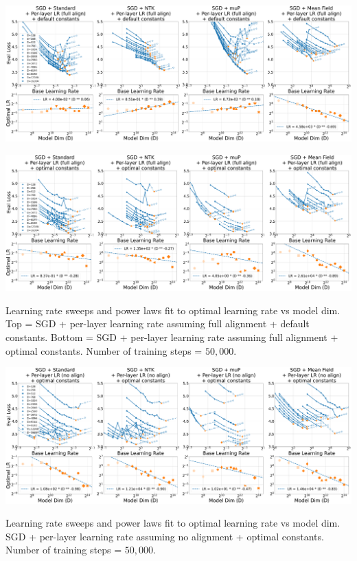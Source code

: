 \documentclass{article}
\theoremstyle{plain}
\theoremstyle{definition}
\theoremstyle{remark}
\begin{document}
\thispagestyle{plain}
\begin{SidewaysFigure}
\includegraphics[width=0.98\linewidth]{icml2024/figures/lr_sweeps/appendix/sgd/sgd+50k_steps_per_module_lr.pdf}

\figvspace

\includegraphics[width=0.98\linewidth]{icml2024/figures/lr_sweeps/appendix/sgd/sgd+50k_steps_per_module_lr_optimal_constants.pdf}
\caption{Learning rate sweeps and power laws fit to optimal learning rate vs model dim. Top = SGD + per-layer learning rate assuming full alignment + default constants. Bottom = SGD + per-layer learning rate assuming full alignment + optimal constants. Number of training steps = $50{,}000$.}
\end{SidewaysFigure}
\clearpage

\thispagestyle{plain}
\begin{SidewaysFigure}
\includegraphics[width=0.98\linewidth]{icml2024/figures/lr_sweeps/appendix/sgd/sgd+50k_steps_per_module_lr_optimal_constants_no_align.pdf}
\caption{Learning rate sweeps and power laws fit to optimal learning rate vs model dim. SGD + per-layer learning rate assuming no alignment + optimal constants. Number of training steps = $50{,}000$.}
\end{SidewaysFigure}
\clearpage
\end{document}
